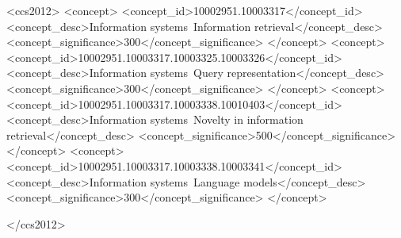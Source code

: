 \documentclass[sigconf,natbib=true,anonymous=true]{acmart}
\begin{document}
\begin{CCSXML}
  <ccs2012>
     <concept>
         <concept_id>10002951.10003317</concept_id>
         <concept_desc>Information systems~Information retrieval</concept_desc>
         <concept_significance>300</concept_significance>
         </concept>
     <concept>
         <concept_id>10002951.10003317.10003325.10003326</concept_id>
         <concept_desc>Information systems~Query representation</concept_desc>
         <concept_significance>300</concept_significance>
         </concept>
     <concept>
         <concept_id>10002951.10003317.10003338.10010403</concept_id>
         <concept_desc>Information systems~Novelty in information retrieval</concept_desc>
         <concept_significance>500</concept_significance>
         </concept>
     <concept>
         <concept_id>10002951.10003317.10003338.10003341</concept_id>
         <concept_desc>Information systems~Language models</concept_desc>
         <concept_significance>300</concept_significance>
         </concept>
     
   </ccs2012>
\end{CCSXML}
  



\maketitle
\let\clearpage\relax  %
  
  







\end{document}

